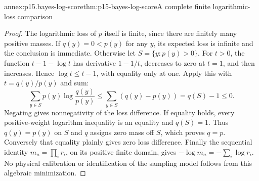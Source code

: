 \begin{annexitem}{annex:p15.bayes-log-score}{thm:p15-bayes-log-score}{A complete finite logarithmic-loss comparison}
\begin{proof}
The logarithmic loss of \(p\) itself is finite, since
there are finitely many positive masses.
If \(q(y)=0<p(y)\) for any \(y\), its expected loss is
infinite and the conclusion is immediate.
Otherwise let \(S=\{y:p(y)>0\}\).
For \(t>0\), the function \(t-1-\log t\) has derivative
\(1-1/t\), decreases to zero at \(t=1\), and then
increases. Hence \(\log t\leq t-1\), with equality
only at one. Apply this with \(t=q(y)/p(y)\) and sum:
\[
 \sum_{y\in S}p(y)\log\frac{q(y)}{p(y)}
       \leq\sum_{y\in S}(q(y)-p(y))
       =q(S)-1\leq0.
\]
Negating gives nonnegativity of the loss difference.
If equality holds, every positive-weight logarithm
inequality is an equality and \(q(S)=1\).
Thus \(q(y)=p(y)\) on \(S\) and \(q\) assigns zero
mass off \(S\), which proves \(q=p\).
Conversely that equality plainly gives zero loss difference.
Finally the sequential identity
\(m_n=\prod_i r_i\), on its positive finite domain,
gives \(-\log m_n=-\sum_i\log r_i\).
No physical calibration or identification of the
sampling model follows from this algebraic minimization.
\end{proof}
\end{annexitem}

